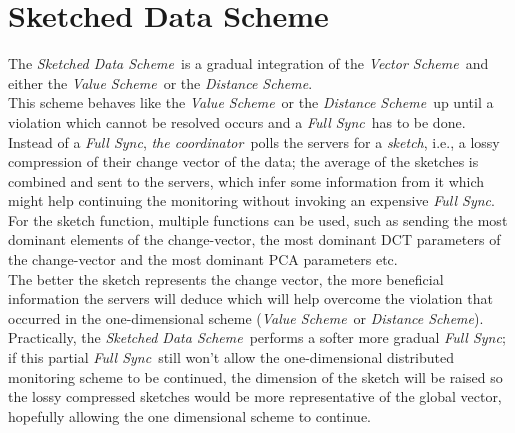 \documentclass[10pt, conference]{IEEEtran}
\newcommand{\vectorScheme}{\textit{Vector Scheme}}
\newcommand{\valueScheme}{\textit{Value Scheme}}
\newcommand{\distanceScheme}{\textit{Distance Scheme}}
\newcommand{\sketchScheme}{\textit{Sketched Data Scheme}}
\newcommand{\fullSync}{\textit{Full Sync}}
\newcommand{\theCoordinator}{\textit{the coordinator}}
\begin{document}
\section{Sketched Data Scheme}
The \sketchScheme \ is a gradual integration of the \vectorScheme \ and either the \valueScheme \ or the \distanceScheme . \\
This scheme behaves like the \valueScheme \ or the \distanceScheme \ up until a violation which cannot be resolved occurs and a \fullSync \ has to be done. Instead of a \fullSync , \theCoordinator \ polls the servers for a \textit{sketch}, i.e., a lossy compression of their change vector of the data; the average of the sketches is combined and sent to the servers, which infer some information from it which might help continuing the monitoring without invoking an expensive \fullSync. For the sketch function, multiple functions can be used, such as sending the most dominant elements of the change-vector, the most dominant DCT parameters of the change-vector and the most dominant PCA parameters etc. \\
The better the sketch represents the change vector, the more beneficial information the servers will deduce which will help overcome the violation that occurred in the one-dimensional scheme (\valueScheme \ or \distanceScheme ). \\
Practically, the \sketchScheme \ performs a softer more gradual \fullSync; if this partial \fullSync \ still won't allow the one-dimensional distributed monitoring scheme to be continued, the dimension of the sketch will be raised so the lossy compressed sketches would be more representative of the global vector, hopefully allowing the one dimensional scheme to continue. \\
\end{document}
